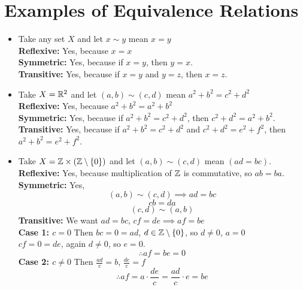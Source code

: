 \documentclass[openany]{report}
\begin{document}
\section{Examples of Equivalence Relations}
\onehalfspacing
\begin{itemize}
    \item Take any set $X$ and let $x \sim y$ mean $x = y$\\
    \textbf{Reflexive:}  Yes, because $x = x$\\
    \textbf{Symmetric:}  Yes, because if $x=y$, then $y = x$.\\
    \textbf{Transitive:}  Yes, because if $x=y$ and $y = z$, then $x = z$.
    
    \item Take $X = \mathbb{R}^2$ and let $(a,b) \sim (c,d)$ mean $a^2 + b^2 = c^2 + d^2$\\
    \textbf{Reflexive:}  Yes, because $a^2 + b^2 = a^2 + b^2$\\
    \textbf{Symmetric:}  Yes, because if $a^2 + b^2 = c^2 + d^2$, then $c^2 + d^2 = a^2 + b^2$.\\
    \textbf{Transitive:}  Yes, because if $a^2 + b^2 = c^2 + d^2$ and $c^2 + d^2 = e^2 + f^2$, then $a^2 + b^2 =  e^2 + f^2$.

    \item Take $X = \mathbb{Z} \times (\mathbb{Z} \setminus \{0\})$ and let $(a,b) \sim (c,d)$ mean $(ad = bc)$.\\
    \textbf{Reflexive:}  Yes, because multiplication of $\mathbb{Z}$ is commutative, so $ab = ba$.\\
    \textbf{Symmetric:}  Yes,
    $$(a,b) \sim (c,d) \implies ad = bc$$
    $$cb = da$$
    $$(c,d) \sim (a,b)$$
    \textbf{Transitive:}  We want $ad = bc$, $cf = de \implies af = be$\\
    \textbf{Case 1: $c = 0$} Then $bc = 0 = ad$, $d \in \mathbb{Z} \setminus \{0\}$, so $d\neq 0$, $a = 0$\\
    $cf = 0 = de$, again $d \neq 0$, so $e = 0$.\\
    \[\therefore af = be = 0\]
    \textbf{Case 2: $c \neq 0$} Then $\frac{ad}{c} = b$, $\frac{de}{c} = f$
    \[\therefore af = a \cdot \frac{de}{c} = \frac{ad}{c} \cdot e = be\]
\end{itemize}
\end{document}
